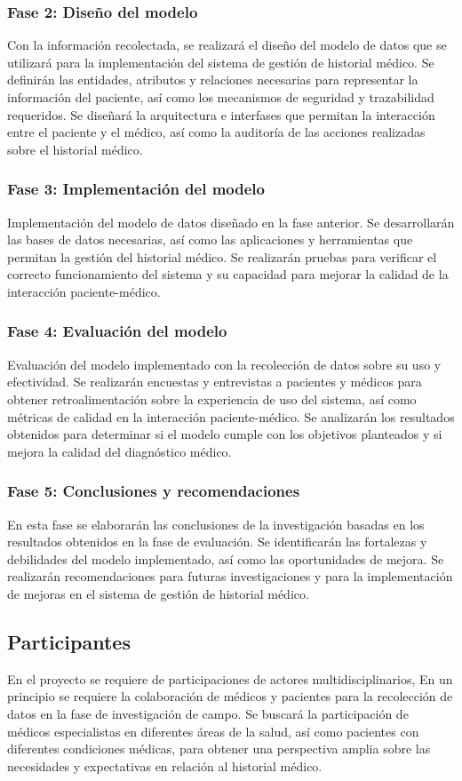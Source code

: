     \subsubsection{Fase 2: Diseño del modelo}
    Con la información recolectada, se realizará el diseño del  modelo de datos que se utilizará para la implementación del sistema de gestión de historial médico. Se definirán las entidades, atributos y relaciones necesarias para representar la información del paciente, así como los mecanismos de seguridad y trazabilidad requeridos. Se diseñará la arquitectura e interfases que permitan la interacción entre el paciente y el médico, así como la auditoría de las acciones realizadas sobre el historial médico.
    \subsubsection{Fase 3: Implementación del modelo}
    Implementación del modelo de datos diseñado en la fase anterior. Se desarrollarán las bases de datos necesarias, así como las aplicaciones y herramientas que permitan la gestión del historial médico. Se realizarán pruebas para verificar el correcto funcionamiento del sistema y su capacidad para mejorar la calidad de la interacción paciente-médico.
    \subsubsection{Fase 4: Evaluación del modelo}
    Evaluación del modelo implementado con la recolección de datos sobre su uso y efectividad. Se realizarán encuestas y entrevistas a pacientes y médicos para obtener retroalimentación sobre la experiencia de uso del sistema, así como métricas de calidad en la interacción paciente-médico. Se analizarán los resultados obtenidos para determinar si el modelo cumple con los objetivos planteados y si mejora la calidad del diagnóstico médico.
    \subsubsection{Fase 5: Conclusiones y recomendaciones}
    En esta fase se elaborarán las conclusiones de la investigación basadas en los resultados obtenidos en la fase de evaluación. Se identificarán las fortalezas y debilidades del modelo implementado, así como las oportunidades de mejora. Se realizarán recomendaciones para futuras investigaciones y para la implementación de mejoras en el sistema de gestión de historial médico.    
    \subsection{Participantes}
    En el proyecto se requiere de participaciones de actores multidisciplinarios, En un principio se requiere la colaboración de médicos y pacientes para la recolección de datos en la fase de investigación de campo. Se buscará la participación de médicos especialistas en diferentes áreas de la salud, así como pacientes con diferentes condiciones médicas, para obtener una perspectiva amplia sobre las necesidades y expectativas en relación al historial médico.

